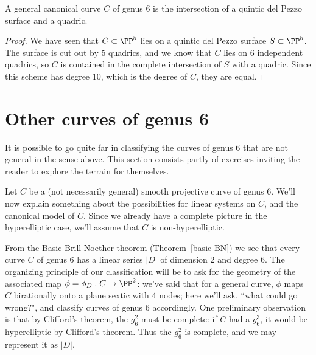 \begin{theorem}
A general canonical curve $C$ of genus 6 is the intersection of a quintic del Pezzo surface and a quadric. 
\end{theorem}

\begin{proof}
We have seen that $C \subset \PP^5$ lies on a quintic del Pezzo surface $S \subset \PP^5$. The surface is cut out by 5 quadrics, and we know that $C$ lies on 6 independent quadrics,
so $C$ is contained in the complete intersection of $S$ with a quadric. Since this scheme has degree 10, which is the degree of $C$, they are equal.
\end{proof}


\section{Other curves of genus 6}

It is possible to go quite far in classifying the curves of genus 6 that are not general in the sense above. This section consists partly of exercises inviting the reader to explore the terrain for themselves.

Let $C$ be a (not necessarily general) smooth projective curve of genus 6. We'll now explain something about the possibilities for  linear systems on $C$, and the canonical model of $C$. Since we already have a complete picture in the hyperelliptic case, we'll assume that $C$ is non-hyperelliptic.

From the Basic Brill-Noether theorem (Theorem~\ref{basic BN}) we see that every curve $C$ of genus 6 has a linear series $|D|$ of dimension 2
and degree 6. The organizing principle of our classification will be to ask for the geometry of the associated map $\phi = \phi_D : C \to \PP^2$: we've said that for a general curve,  $\phi$ maps $C$ birationally onto a plane sextic with 4 nodes; here we'll ask, ``what could go wrong?", and classify curves of genus 6 accordingly. One preliminary observation is that by Clifford's theorem, the $g^2_6$ must be complete:  if $C$ had a $g^3_6$, it would be hyperelliptic by Clifford's theorem. Thus the $g^2_6$ is complete, and we may represent it as $|D|$.

